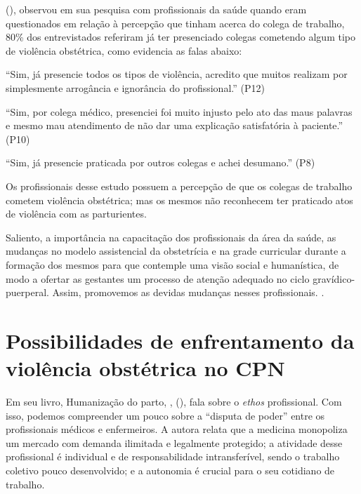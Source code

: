 \citeauthor{cardoso2017violencia} (\citeyear{cardoso2017violencia}), observou em sua pesquisa com profissionais da saúde quando eram questionados em relação à percepção que tinham acerca do colega de trabalho, 80\% dos entrevistados referiram já ter presenciado colegas cometendo algum tipo de violência obstétrica, como evidencia as falas abaixo: 

\begin{citacao}
``Sim, já presencie todos os tipos de violência, acredito que muitos realizam por simplesmente arrogância e ignorância do profissional.'' (P12)
\end{citacao}

\begin{citacao}
``Sim, por colega médico, presenciei foi muito injusto pelo ato das maus palavras e mesmo mau atendimento de não dar uma explicação satisfatória à paciente.'' (P10) 
\end{citacao}

\begin{citacao}
``Sim, já presencie praticada por outros colegas e achei desumano.'' (P8)
\end{citacao}

Os profissionais desse estudo possuem a percepção de que os colegas de trabalho cometem violência obstétrica; mas os mesmos não reconhecem ter praticado atos de violência com as parturientes.

Saliento, a importância na capacitação dos profissionais da área da saúde, as mudanças no modelo assistencial da obstetrícia e na grade curricular durante a formação dos mesmos para que contemple uma visão social e humanística, de modo a ofertar as gestantes um processo de atenção adequado no ciclo gravídico-puerperal. Assim, promovemos as devidas mudanças nesses profissionais. \cite{sauaia2016dor,cardoso2017violencia}.

\section{Possibilidades de enfrentamento da violência obstétrica no CPN}

Em seu livro, Humanização do parto, \citeauthor{maia2010humanizaccao}, (\citeyear{maia2010humanizaccao}), fala sobre o \textit{ethos} profissional. Com isso, podemos compreender um pouco sobre a ``disputa de poder'' entre os profissionais médicos e enfermeiros. A autora relata que a medicina monopoliza um mercado com demanda ilimitada e legalmente protegido; a atividade desse profissional é individual e de responsabilidade intransferível, sendo o trabalho coletivo pouco desenvolvido; e a autonomia é crucial para o seu cotidiano de trabalho. 

